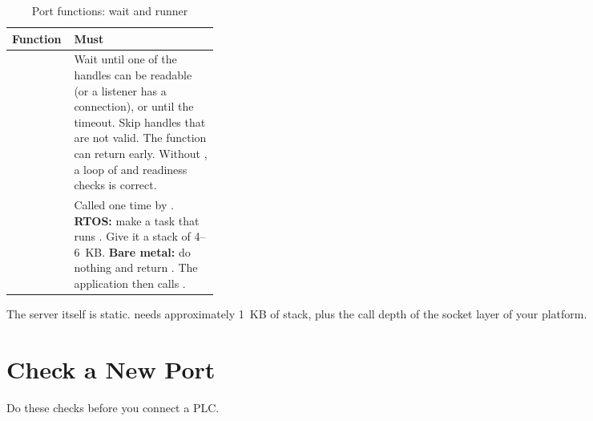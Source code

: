 \begin{table}[htbp]
\centering
\caption{Port functions: wait and runner}\label{tab:halrun}
\small
\begin{tabularx}{\linewidth}{@{}P{0.30\linewidth}L@{}}
\toprule
\textbf{Function} & \textbf{Must} \\
\midrule
{} & Wait until one of the handles can be readable (or a listener has a connection), or until the timeout. Skip handles that are not valid. The function can return early. Without , a loop of  and readiness checks is correct. \\
 & Called one time by . \textbf{RTOS:} make a task that runs . Give it a stack of 4--6~KB. \textbf{Bare metal:} do nothing and return . The application then calls . \\
\bottomrule
\end{tabularx}
\end{table}

The server itself is static.  needs approximately
1~KB of stack, plus the call depth of the socket layer of your platform.

\section{Check a New Port}\label{sec:checkport}

Do these checks before you connect a PLC.

